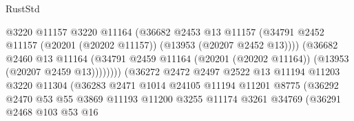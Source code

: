 \begin{lexlean}{RustStd}
\begin{coremodule}
                                          @3220
                                          @11157
                                          @3220
                                          @11164
                                          (@36682
                                            @2453
                                            @13
                                            @11157
                                            (@34791
                                              @2452
                                              @11157
                                              (@20201 (@20202 @11157))
                                              (@13953 (@20207 @2452 @13))))
                                          (@36682
                                            @2460
                                            @13
                                            @11164
                                            (@34791
                                              @2459
                                              @11164
                                              (@20201 (@20202 @11164))
                                              (@13953 (@20207 @2459 @13))))))))
                                  (@36272
                                    @2472
                                    @2497
                                    @2522
                                    @13
                                    @11194
                                    @11203
                                    @3220
                                    @11304
                                    (@36283
                                      @2471
                                      @1014
                                      @24105
                                      @11194
                                      @11201
                                      @8775
                                      (@36292
                                        @2470
                                        @53
                                        @55
                                        @3869
                                        @11193
                                        @11200
                                        @3255
                                        @11174
                                        @3261
                                        @34769
                                        (@36291
                                          @2468
                                          @103
                                          @53
                                          @16

\end{coremodule}
\end{lexlean}
